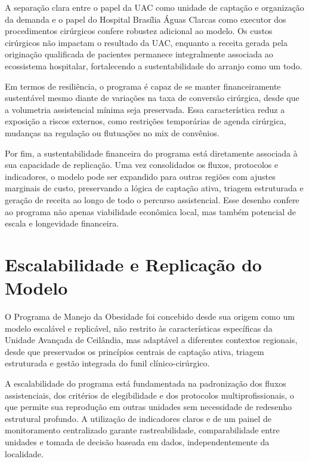 \documentclass[12pt]{article}
\begin{document}
A separação clara entre o papel da UAC como unidade de captação e organização da demanda e o papel do Hospital Brasília Águas Clarcas como executor dos procedimentos cirúrgicos confere robustez adicional ao modelo. Os custos cirúrgicos não impactam o resultado da UAC, enquanto a receita gerada pela originação qualificada de pacientes permanece integralmente associada ao ecossistema hospitalar, fortalecendo a sustentabilidade do arranjo como um todo.

Em termos de resiliência, o programa é capaz de se manter financeiramente sustentável mesmo diante de variações na taxa de conversão cirúrgica, desde que a volumetria assistencial mínima seja preservada. Essa característica reduz a exposição a riscos externos, como restrições temporárias de agenda cirúrgica, mudanças na regulação ou flutuações no mix de convênios.

Por fim, a sustentabilidade financeira do programa está diretamente associada à sua capacidade de replicação. Uma vez consolidados os fluxos, protocolos e indicadores, o modelo pode ser expandido para outras regiões com ajustes marginais de custo, preservando a lógica de captação ativa, triagem estruturada e geração de receita ao longo de todo o percurso assistencial. Esse desenho confere ao programa não apenas viabilidade econômica local, mas também potencial de escala e longevidade financeira.

\FGVNewPage

\section{Escalabilidade e Replicação do Modelo}
\label{sec:org8ef7f87}
O Programa de Manejo da Obesidade foi concebido desde sua origem como um modelo escalável e replicável, não restrito às características específicas da Unidade Avançada de Ceilândia, mas adaptável a diferentes contextos regionais, desde que preservados os princípios centrais de captação ativa, triagem estruturada e gestão integrada do funil clínico-cirúrgico.

A escalabilidade do programa está fundamentada na padronização dos fluxos assistenciais, dos critérios de elegibilidade e dos protocolos multiprofissionais, o que permite sua reprodução em outras unidades sem necessidade de redesenho estrutural profundo. A utilização de indicadores claros e de um painel de monitoramento centralizado garante rastreabilidade, comparabilidade entre unidades e tomada de decisão baseada em dados, independentemente da localidade.
\end{document}
